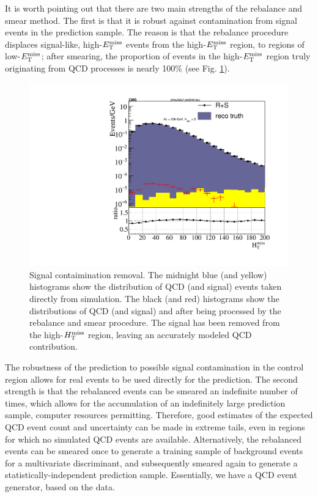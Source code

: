 It is worth pointing out that there are two main strengths of the rebalance and smear method. The first is that it is robust against contamination from signal events in the prediction sample. The reason is that the rebalance procedure displaces signal-like, high-$E_{\text{T}}^{\rm miss}$ events from the high-$E_{\text{T}}^{\rm miss}$ region, to regions of low-$E_{\text{T}}^{\rm miss}$; after smearing, the proportion of events in the high-$E_{\text{T}}^{\rm miss}$ region truly originating from QCD processes is nearly 100\% (see Fig. \ref{fig:RplusSContamination}). 
\begin{figure}[t]
\centering
\includegraphics[width=0.6\linewidth]{figures/SusySearches/Ra2b2016/RplusSContam.pdf}
\caption{Signal contaimination removal. The midnight blue (and yellow) histograms show the distribution of QCD (and signal) events taken directly from simulation. The black (and red) histograms show the distributions of QCD (and signal) and after being processed by the rebalance and smear procedure. The signal has been removed from the high-$H_{\text{T}}^{\rm miss}$ region, leaving an accurately modeled QCD contribution.}
\label{fig:RplusSContamination}
\end{figure}
The robustness of the prediction to possible signal contamination in the control region allows for real events to be used directly for the prediction. The second strength is that the rebalanced events can be smeared an indefinite number of times, which allows for the accumulation of an indefinitely large prediction sample, computer resources permitting. Therefore, good estimates of the expected QCD event count and uncertainty can be made in extreme tails, even in regions for which no simulated QCD events are available. Alternatively, the rebalanced events can be smeared once to generate a training sample of background events for a multivariate discriminant, and subsequently smeared again to generate a statistically-independent prediction sample. Essentially, we have a QCD event generator, based on the data. 
\FloatBarrier
